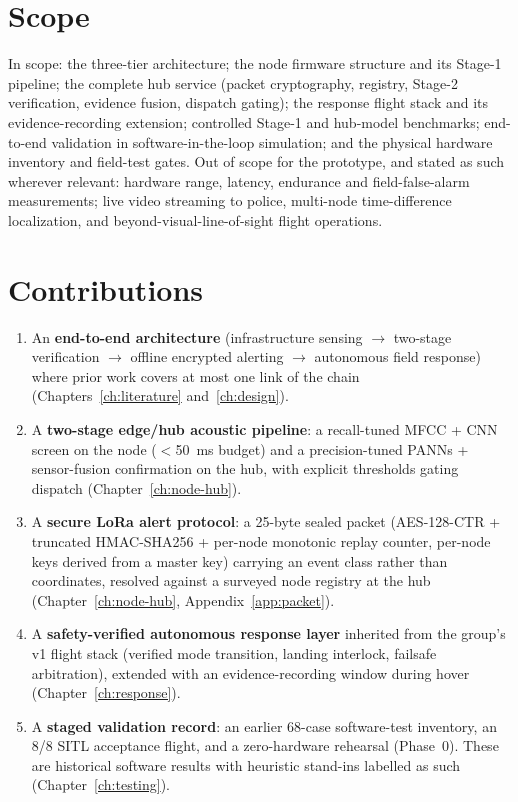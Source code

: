 \documentclass[12pt,a4paper]{report}
\begin{document}
\section{Scope}
\label{sec:scope}

In scope: the three-tier architecture; the node firmware structure and
its Stage-1 pipeline; the complete hub service (packet cryptography,
registry, Stage-2 verification, evidence fusion, dispatch gating); the
response flight stack and its evidence-recording extension; controlled
Stage-1 and hub-model benchmarks; end-to-end validation in
software-in-the-loop simulation; and the physical hardware inventory
and field-test gates. Out of scope for the prototype, and stated as
such wherever relevant: hardware range, latency, endurance and
field-false-alarm measurements; live video streaming to police, multi-node
time-difference localization, and beyond-visual-line-of-sight flight
operations.

\section{Contributions}
\label{sec:contributions}

\begin{enumerate}
\item An \textbf{end-to-end architecture} (infrastructure sensing
  $\rightarrow$ two-stage verification $\rightarrow$ offline encrypted
  alerting $\rightarrow$ autonomous field response) where prior
  work covers at most one link of the chain
  (Chapters~\ref{ch:literature} and~\ref{ch:design}).
\item A \textbf{two-stage edge/hub acoustic pipeline}: a recall-tuned
  MFCC + CNN screen on the node ($<$50~ms budget) and a
  precision-tuned PANNs + sensor-fusion confirmation on the hub, with
  explicit thresholds gating dispatch (Chapter~\ref{ch:node-hub}).
\item A \textbf{secure LoRa alert protocol}: a 25-byte sealed packet
  (AES-128-CTR + truncated HMAC-SHA256 + per-node monotonic replay
  counter, per-node keys derived from a master key) carrying an event
  class rather than coordinates, resolved against a surveyed node
  registry at the hub (Chapter~\ref{ch:node-hub},
  Appendix~\ref{app:packet}).
\item A \textbf{safety-verified autonomous response layer} inherited
  from the group's v1 flight stack (verified mode transition,
  landing interlock, failsafe arbitration), extended with an
  evidence-recording window during hover
  (Chapter~\ref{ch:response}).
\item A \textbf{staged validation record}: an earlier 68-case
  software-test inventory, an 8/8 SITL acceptance flight, and a
  zero-hardware rehearsal (Phase~0). These are historical software
  results with heuristic stand-ins labelled as such
  (Chapter~\ref{ch:testing}).
\end{enumerate}
\end{document}
